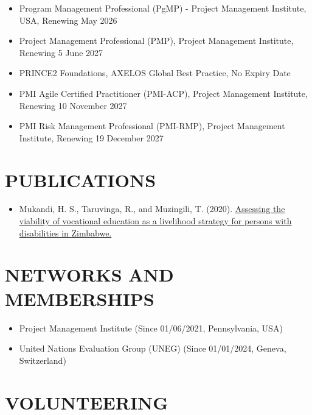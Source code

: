 \documentclass[
  10pt,
]{article}
\providecommand{\tightlist}{%
  \setlength{\itemsep}{0pt}\setlength{\parskip}{0pt}}
\begin{document}
\begin{itemize}[itemsep=0.25em, topsep=0.25em]
  \item Program Management Professional (PgMP) - Project Management Institute, USA, Renewing May 2026  
  \item Project Management Professional (PMP), Project Management Institute, Renewing 5 June 2027  
  \item PRINCE2 Foundations, AXELOS Global Best Practice, No Expiry Date  
  \item PMI Agile Certified Practitioner (PMI-ACP), Project Management Institute, Renewing 10 November 2027  
  \item PMI Risk Management Professional (PMI-RMP), Project Management Institute, Renewing 19 December 2027
\end{itemize}

\vspace{0.5cm}

\section{PUBLICATIONS}\label{publications}

\begin{itemize}
\tightlist
\item
  Mukandi, H. S., Taruvinga, R., and Muzingili, T. (2020).
  \href{https://catalogue.leidenuniv.nl/permalink/31UKB_LEU/s5ab2f/alma9939992501102711}{Assessing
  the viability of vocational education as a livelihood strategy for
  persons with disabilities in Zimbabwe.}
\end{itemize}

\vspace{0.5cm}

\section{NETWORKS AND MEMBERSHIPS}\label{networks-and-memberships}

\begin{itemize}[itemsep=0.25em, topsep=0.25em]
  \item Project Management Institute (Since 01/06/2021, Pennsylvania, USA)  
  \item United Nations Evaluation Group (UNEG) (Since 01/01/2024, Geneva, Switzerland)
\end{itemize}

\vspace{0.5cm}

\section{VOLUNTEERING}\label{volunteering}
\end{document}

